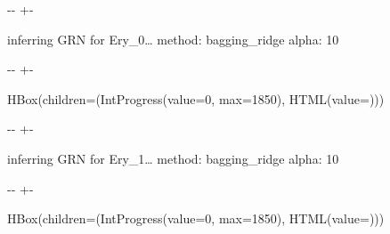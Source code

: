 \documentclass[letterpaper,10pt,english]{sphinxmanual}
\newlength\nbsphinxcodecellspacing
\begin{document}
%
{
\kern-\sphinxverbatimsmallskipamount\kern-\baselineskip
\kern+\FrameHeightAdjust\kern-\fboxrule
\vspace{\nbsphinxcodecellspacing}
%
\begin{sphinxVerbatim}[commandchars=\\\{\}]
inferring GRN for Ery\_0{\ldots}
method: bagging\_ridge
alpha: 10
\end{sphinxVerbatim}
}
\relax

{

\kern-\sphinxverbatimsmallskipamount\kern-\baselineskip
\kern+\FrameHeightAdjust\kern-\fboxrule
\vspace{\nbsphinxcodecellspacing}

%
\begin{sphinxVerbatim}[commandchars=\\\{\}]
HBox(children=(IntProgress(value=0, max=1850), HTML(value=\PYGZsq{}\PYGZsq{})))
\end{sphinxVerbatim}
}



%
{
\kern-\sphinxverbatimsmallskipamount\kern-\baselineskip
\kern+\FrameHeightAdjust\kern-\fboxrule
\vspace{\nbsphinxcodecellspacing}
%
\begin{sphinxVerbatim}[commandchars=\\\{\}]

inferring GRN for Ery\_1{\ldots}
method: bagging\_ridge
alpha: 10
\end{sphinxVerbatim}
}
\relax

{

\kern-\sphinxverbatimsmallskipamount\kern-\baselineskip
\kern+\FrameHeightAdjust\kern-\fboxrule
\vspace{\nbsphinxcodecellspacing}

%
\begin{sphinxVerbatim}[commandchars=\\\{\}]
HBox(children=(IntProgress(value=0, max=1850), HTML(value=\PYGZsq{}\PYGZsq{})))
\end{sphinxVerbatim}
}
\end{document}
